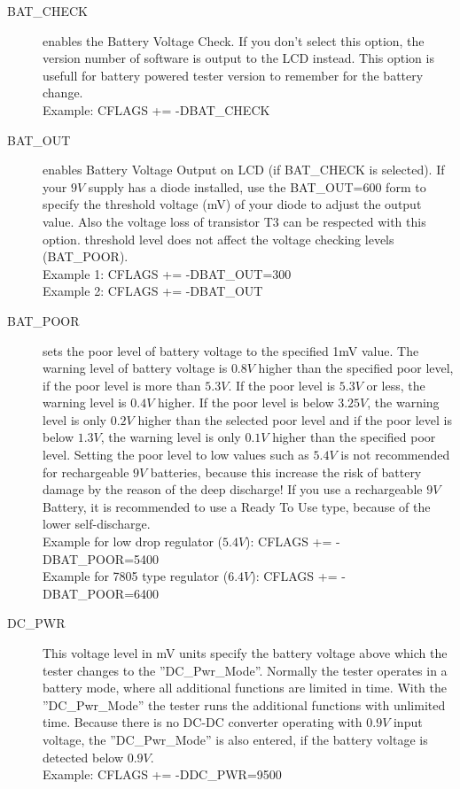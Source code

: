 \begin{description}
  \item[BAT\_CHECK] enables the Battery Voltage Check. If you don't select this option, the version number of
software is output to the LCD instead.
This option is usefull for battery powered tester version to remember for the battery change.\\
Example: CFLAGS += -DBAT\_CHECK

  \item[BAT\_OUT] enables Battery Voltage Output on LCD (if BAT\_CHECK is selected).
 If your \(9V\) supply has a diode installed, use the BAT\_OUT=600 form to specify the threshold voltage (mV) of your diode
to adjust the output value.
Also the voltage loss of transistor T3 can be respected with this option.
 threshold level does not affect the voltage checking levels (BAT\_POOR).\\
Example 1: CFLAGS += -DBAT\_OUT=300\\
Example 2: CFLAGS += -DBAT\_OUT

  \item[BAT\_POOR] sets the poor level of battery voltage to the specified 1mV value.
The warning level of battery voltage is \(0.8V\) higher than the specified poor level, if the poor level is more than \(5.3V\).
If the poor level is \(5.3V\) or less, the warning level is \(0.4V\) higher. If the poor level is below \(3.25V\), the
warning level is only \(0.2V\) higher than the selected poor level and if the poor level is below \(1.3V\), the
warning level is only \(0.1V\) higher than the specified poor level.
Setting the poor level to low values such as \(5.4V\) is not recommended for rechargeable \(9V\) batteries,
because this increase the risk of battery damage by the reason of the deep discharge!
If you use a rechargeable \(9V\) Battery, it is recommended to use a Ready To Use type, because of the lower self-discharge.\\
Example for low drop regulator (\(5.4V\)): CFLAGS += -DBAT\_POOR=5400\\
Example for 7805 type regulator (\(6.4V\)): CFLAGS += -DBAT\_POOR=6400

  \item[DC\_PWR] This voltage level in mV units specify the battery voltage above which the tester
changes to the ''DC\_Pwr\_Mode''. Normally the tester operates in a battery mode, where all additional
functions are limited in time. With the ''DC\_Pwr\_Mode'' the tester runs the additional functions with unlimited time.
Because there is no DC-DC converter operating with \(0.9V\) input voltage,
the ''DC\_Pwr\_Mode'' is also entered, if the battery voltage is detected below \(0.9V\). \\
Example: CFLAGS += -DDC\_PWR=9500


\end{description}
